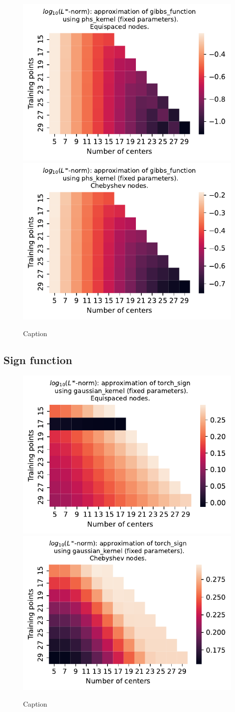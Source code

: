\documentclass[12pt]{report} %
\begin{document}
\begin{figure}[ht]
  \centering

  \includegraphics[width=.49\textwidth]{imagenes/experiments/1d/least_squares/opt-gibbs_function-Kphs_kernel-Equi.pdf}
  \includegraphics[width=.49\textwidth]{imagenes/experiments/1d/least_squares/opt-gibbs_function-Kphs_kernel-Cheb.pdf}
  \caption{Caption}
  \label{fig:opt-gibbs-phs}
\end{figure}


\subsection*{Sign function}

\begin{figure}[ht]
  \centering

  \includegraphics[width=.49\textwidth]{imagenes/experiments/1d/least_squares/opt-torch_sign-Kgaussian_kernel-Equi.pdf}
  \includegraphics[width=.49\textwidth]{imagenes/experiments/1d/least_squares/opt-torch_sign-Kgaussian_kernel-Cheb.pdf}
  \caption{Caption}
  \label{fig:opt-torch-sign-gaussian}
\end{figure}
\end{document}
